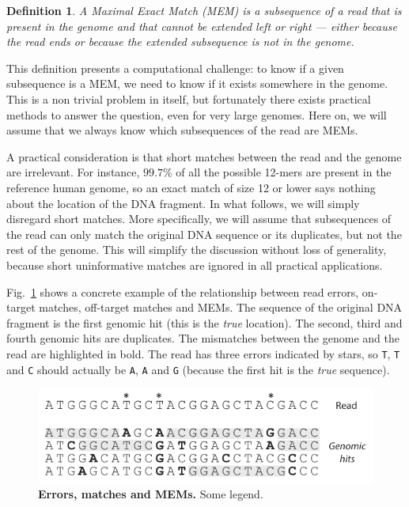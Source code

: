 \documentclass{article}
\newtheorem{definition}{Definition}
\begin{document}
\begin{definition}
A Maximal Exact Match (MEM) is a subsequence of a read that is present in
the genome and that cannot be extended left or right --- either because
the read ends or because the extended subsequence is not in the genome.
\end{definition}

This definition presents a computational challenge: to know if a given
subsequence is a MEM, we need to know if it exists somewhere in the
genome. This is a non trivial problem in itself, but fortunately there
exists practical methods to answer the question, even for very large
genomes. Here on, we will assume that we always know which subsequences of
the read are MEMs.

A practical consideration is that short matches between the read and the
genome are irrelevant. For instance, $99.7\%$ of all the possible 12-mers
are present in the reference human genome, so an exact match of size 12 or
lower says nothing about the location of the DNA fragment. In what
follows, we will simply disregard short matches. More specifically, we
will assume that subsequences of the read can only match the original DNA
sequence or its duplicates, but not the rest of the genome. This will
simplify the discussion without loss of generality, because short
uninformative matches are ignored in all practical applications.

Fig.~\ref{fig:MEM_example} shows a concrete example of the relationship
between read errors, on-target matches, off-target matches and MEMs. The
sequence of the original DNA fragment is the first genomic hit (this is
the \emph{true} location). The second, third and fourth genomic hits are
duplicates. The mismatches between the genome and the read are
highlighted in bold. The read has three errors indicated by stars, so
\texttt{T}, \texttt{T} and \texttt{C} should actually be \texttt{A},
\texttt{A} and \texttt{G} (because the first hit is the \emph{true}
sequence).

\begin{figure}[h]
\centering
\includegraphics[scale=1]{MEM_example.pdf}
\caption{\textbf{Errors, matches and MEMs.}
Some legend.}
\label{fig:MEM_example}
\end{figure}
\end{document}
